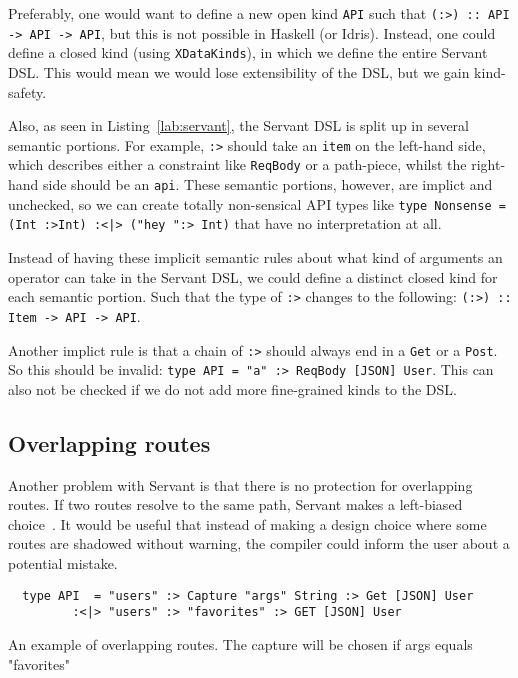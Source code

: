 \documentclass[12pt,a4paper]{article}
\begin{document}
Preferably, one would want to define a new open kind \texttt{API} such that \texttt{(:>) :: API -> API -> API}, but this is not possible in Haskell (or Idris). Instead, one could define a closed kind (using \texttt{XDataKinds}), in which we define the entire Servant DSL. This would mean we would lose extensibility of the DSL, but we gain kind-safety.

Also, as seen in Listing~\ref{lab:servant}, the Servant DSL is split up in several semantic portions.  For example, \texttt{:>} should take an \texttt{item} on the left-hand side, which describes either a constraint like \texttt{ReqBody} or a path-piece, whilst the right-hand side should be an \texttt{api}.
These semantic portions, however,  are implict and unchecked, so we can create totally non-sensical API types like \texttt{type Nonsense = (Int :>Int) :<|> ("hey ":> Int)} that have no interpretation at all.

Instead of having these implicit semantic rules about what kind of arguments an operator can take in the Servant DSL, we could define a distinct closed kind for each semantic portion. Such that the type of \texttt{:>} changes to the following: \texttt{(:>) :: Item -> API -> API}.

Another implict rule is that a chain of \texttt{:>} should always end in a \texttt{Get} or a \texttt{Post}. So this should be invalid: \texttt{type API = "a" :> ReqBody [JSON] User}.  This can also not be checked if we do not add more fine-grained kinds to the DSL.

\subsection{Overlapping routes}
Another problem with Servant is that there is no protection for overlapping routes.
If two routes resolve to the same path, Servant makes a left-biased choice~\cite{servant}.
It would be useful that instead of making a design choice where some routes are shadowed without warning, the compiler could inform the user about a potential mistake.

\begin{listing}
\begin{verbatim}
  type API  = "users" :> Capture "args" String :> Get [JSON] User
         :<|> "users" :> "favorites" :> GET [JSON] User
\end{verbatim}
\caption{An example of overlapping routes. The capture will be chosen if args equals "favorites"}
\end{listing}
\end{document}
